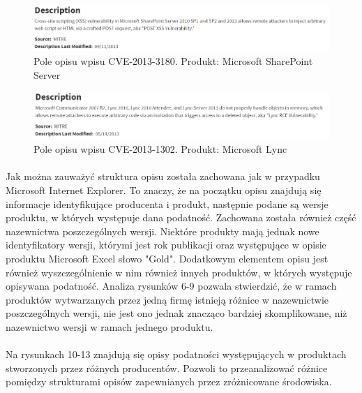 \documentclass[a4paper,12pt,twoside]{article}
\begin{document}
\begin{figure}[h]
    \centering
    \includegraphics[width=1.0\textwidth]{image/008CVE20133180.png}
    \caption{Pole opisu wpisu CVE-2013-3180. Produkt: Microsoft SharePoint Server}
\end{figure}

\begin{figure}[h]
    \centering
    \includegraphics[width=1.0\textwidth]{image/009CVE20131302.png}
    \caption{Pole opisu wpisu CVE-2013-1302. Produkt: Microsoft Lync}
\end{figure}

\paragraph{}
Jak można zauważyć struktura opisu została zachowana jak w przypadku Microsoft Internet Explorer. To znaczy, że na początku opisu znajdują się informacje identyfikujące producenta i produkt, następnie podane są wersje produktu, w których występuje dana podatność. Zachowana została również część nazewnictwa poszczególnych wersji. Niektóre produkty mają jednak nowe identyfikatory wersji, którymi jest rok publikacji oraz występujące w opisie produktu Microsoft Excel słowo "Gold". Dodatkowym elementem opisu jest również wyszczególnienie w nim również innych produktów, w których występuje opisywana podatność. Analiza rysunków 6-9 pozwala stwierdzić, że w ramach produktów wytwarzanych przez jedną firmę istnieją różnice w nazewnictwie poszczególnych wersji, nie jest ono jednak znacząco bardziej skomplikowane, niż nazewnictwo wersji w ramach jednego produktu.

\paragraph{}
Na rysunkach 10-13 znajdują się opisy podatności występujących w produktach stworzonych przez różnych producentów. Pozwoli to przeanalizować różnice pomiędzy strukturami opisów zapewnianych przez zróżnicowane środowiska.
\end{document}

